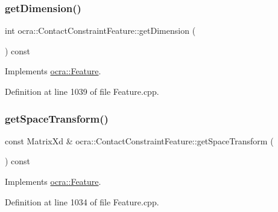 \hypertarget{classocra_1_1ContactConstraintFeature_ac498096b8df524b054f35b05d027f0f0}{}\label{classocra_1_1ContactConstraintFeature_ac498096b8df524b054f35b05d027f0f0} 
\subsubsection{\texorpdfstring{get\+Dimension()}{getDimension()}}
{\footnotesize\ttfamily int ocra\+::\+Contact\+Constraint\+Feature\+::get\+Dimension (\begin{DoxyParamCaption}{ }\end{DoxyParamCaption}) const\hspace{0.3cm}{\ttfamily [virtual]}}



Implements \hyperlink{classocra_1_1Feature_aeda4c2a5ffe638c3de30f8b91a11450e}{ocra\+::\+Feature}.



Definition at line 1039 of file Feature.\+cpp.

\hypertarget{classocra_1_1ContactConstraintFeature_ac7f34721e72544d13e7030182b55f429}{}\label{classocra_1_1ContactConstraintFeature_ac7f34721e72544d13e7030182b55f429} 
\subsubsection{\texorpdfstring{get\+Space\+Transform()}{getSpaceTransform()}}
{\footnotesize\ttfamily const Matrix\+Xd \& ocra\+::\+Contact\+Constraint\+Feature\+::get\+Space\+Transform (\begin{DoxyParamCaption}{ }\end{DoxyParamCaption}) const\hspace{0.3cm}{\ttfamily [virtual]}}



Implements \hyperlink{classocra_1_1Feature_a77eb324fb4da91fd50d0e761d2453ff3}{ocra\+::\+Feature}.



Definition at line 1034 of file Feature.\+cpp.

